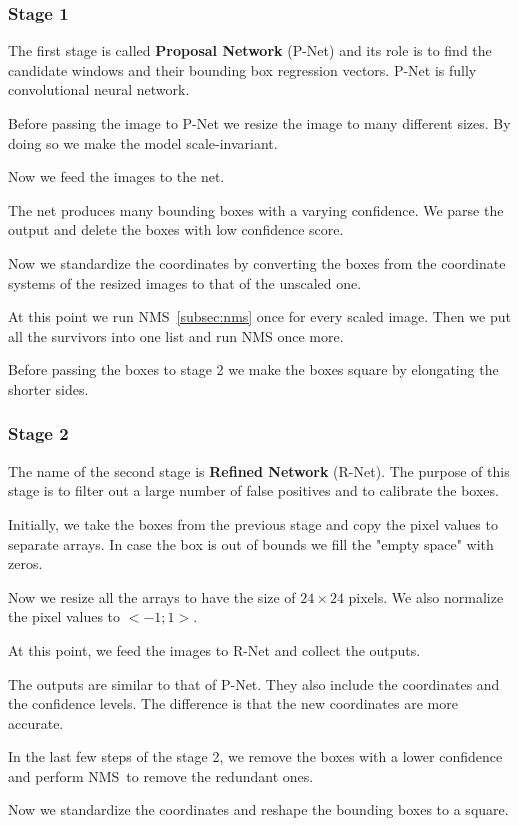 \subsubsection{Stage 1}
The first stage is called \textbf{Proposal Network} (P-Net) and its role is to find the candidate windows and their
bounding box regression vectors.
P-Net is fully convolutional neural network.

Before passing the image to P-Net we resize the image to many different sizes.
By doing so we make the model scale-invariant.

Now we feed the images to the net.

The net produces many bounding boxes with a varying confidence.
We parse the output and delete the boxes with low confidence score.

Now we standardize the coordinates by converting the boxes from the coordinate systems of the resized images to
that of the unscaled one.

At this point we run NMS~\ref{subsec:nms} once for every scaled image.
Then we put all the survivors into one list and run NMS once more.

Before passing the boxes to stage 2 we make the boxes square by elongating the shorter sides.

\subsubsection{Stage 2}
The name of the second stage is \textbf{Refined Network} (R-Net).
The purpose of this stage is to filter out a large number of false positives and to calibrate the boxes.

Initially, we take the boxes from the previous stage and copy the pixel values to separate arrays.
In case the box is out of bounds we fill the "empty space" with zeros.

Now we resize all the arrays to have the size of $24 \times 24$ pixels.
We also normalize the pixel values to $<-1; 1>$.

At this point, we feed the images to R-Net and collect the outputs.

The outputs are similar to that of P-Net.
They also include the coordinates and the confidence levels.
The difference is that the new coordinates are more accurate.

In the last few steps of the stage 2, we remove the boxes with a lower confidence and perform NMS to remove the
redundant ones.

Now we standardize the coordinates and reshape the bounding boxes to a square.


